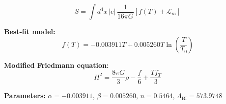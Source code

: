 
\begin{equation}
  S = \int d^4x \, |e| \, \frac{1}{16\pi G} \left[ f(T) + \mathcal{L}_m \right]
\end{equation}

\textbf{Best-fit model:}
\begin{equation}
  f(T) = -0.003911 T + 0.005260 T \ln\!\left(\frac{T}{T_0}\right)
\end{equation}

\textbf{Modified Friedmann equation:}
\begin{equation}
  H^2 = \frac{8\pi G}{3} \rho - \frac{f}{6} + \frac{T f_T}{3}
\end{equation}

\textbf{Parameters:}
$\alpha = -0.003911$, \quad
$\beta = 0.005260$, \quad
$n = 0.5464$, \quad
$\Lambda_{\text{BI}} = 573.9748$